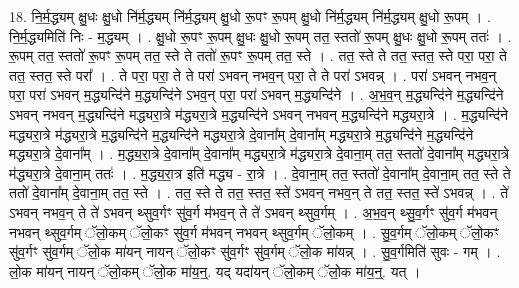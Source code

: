 \documentclass[17pt]{extarticle}
\begin{document}
18. नि॒र्म॒द्ध्यम् क्षु॒धः क्षु॒धो नि॑र्म॒द्ध्यम् नि॑र्म॒द्ध्यम् क्षु॒धो रू॒पꣳ रू॒पम् क्षु॒धो नि॑र्म॒द्ध्यम् नि॑र्म॒द्ध्यम् क्षु॒धो रू॒पम् । . नि॒र्म॒द्ध्यमिति॑ निः - म॒द्ध्यम् । . क्षु॒धो रू॒पꣳ रू॒पम् क्षु॒धः क्षु॒धो रू॒पम् तत॒ स्ततो॑ रू॒पम् क्षु॒धः क्षु॒धो रू॒पम् ततः॑ । . रू॒पम् तत॒ स्ततो॑ रू॒पꣳ रू॒पम् तत॒ स्ते ते ततो॑ रू॒पꣳ रू॒पम् तत॒ स्ते । . तत॒ स्ते ते तत॒ स्तत॒ स्ते परा॒ परा॒ ते तत॒ स्तत॒ स्ते परा᳚ । . ते परा॒ परा॒ ते ते परा॑ ऽभवन् नभव॒न् परा॒ ते ते परा॑ ऽभवन्न् । . परा॑ ऽभवन् नभव॒न् परा॒ परा॑ ऽभवन् म॒द्ध्यन्दि॑ने म॒द्ध्यन्दि॑ने ऽभव॒न् परा॒ परा॑ ऽभवन् म॒द्ध्यन्दि॑ने । . अ॒भ॒व॒न् म॒द्ध्यन्दि॑ने म॒द्ध्यन्दि॑ने ऽभवन् नभवन् म॒द्ध्यन्दि॑ने मद्ध्यरा॒त्रे म॑द्ध्यरा॒त्रे म॒द्ध्यन्दि॑ने ऽभवन् नभवन् म॒द्ध्यन्दि॑ने मद्ध्यरा॒त्रे । . म॒द्ध्यन्दि॑ने मद्ध्यरा॒त्रे म॑द्ध्यरा॒त्रे म॒द्ध्यन्दि॑ने म॒द्ध्यन्दि॑ने मद्ध्यरा॒त्रे दे॒वाना᳚म् दे॒वाना᳚म् मद्ध्यरा॒त्रे म॒द्ध्यन्दि॑ने म॒द्ध्यन्दि॑ने मद्ध्यरा॒त्रे दे॒वाना᳚म् । . म॒द्ध्य॒रा॒त्रे दे॒वाना᳚म् दे॒वाना᳚म् मद्ध्यरा॒त्रे म॑द्ध्यरा॒त्रे दे॒वाना॒म् तत॒ स्ततो॑ दे॒वाना᳚म् मद्ध्यरा॒त्रे म॑द्ध्यरा॒त्रे दे॒वाना॒म् ततः॑ । . म॒द्ध्य॒रा॒त्र इति॑ मद्ध्य - रा॒त्रे । . दे॒वाना॒म् तत॒ स्ततो॑ दे॒वाना᳚म् दे॒वाना॒म् तत॒ स्ते ते ततो॑ दे॒वाना᳚म् दे॒वाना॒म् तत॒ स्ते । . तत॒ स्ते ते तत॒ स्तत॒ स्ते॑ ऽभवन् नभव॒न् ते तत॒ स्तत॒ स्ते॑ ऽभवन्न् । . ते॑ ऽभवन् नभव॒न् ते ते॑ ऽभवन् थ्सुव॒र्गꣳ सु॑व॒र्ग म॑भव॒न् ते ते॑ ऽभवन् थ्सुव॒र्गम् । . अ॒भ॒व॒न् थ्सु॒व॒र्गꣳ सु॑व॒र्ग म॑भवन् नभवन् थ्सुव॒र्गम् ॅलो॒कम् ॅलो॒कꣳ सु॑व॒र्ग म॑भवन् नभवन् थ्सुव॒र्गम् ॅलो॒कम् । . सु॒व॒र्गम् ॅलो॒कम् ॅलो॒कꣳ सु॑व॒र्गꣳ सु॑व॒र्गम् ॅलो॒क मा॑यन् नायन् ॅलो॒कꣳ सु॑व॒र्गꣳ सु॑व॒र्गम् ॅलो॒क मा॑यन्न् । . सु॒व॒र्गमिति॑ सुवः - गम् । . लो॒क मा॑यन् नायन् ॅलो॒कम् ॅलो॒क मा॑य॒न्॒. यद् यदा॑यन् ॅलो॒कम् ॅलो॒क मा॑य॒न्॒. यत् । \newline
\end{document}
